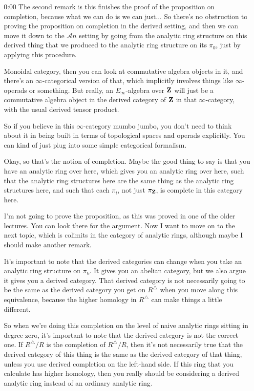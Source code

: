 \begin{unfinished}{0:00}
The second remark is this finishes the proof of the proposition on completion, because what we can do is we can just... So there's no obstruction to proving the proposition on completion in the derived setting, and then we can move it down to the $\mathcal{A}n$ setting by going from the analytic ring structure on this derived thing that we produced to the analytic ring structure on its $\pi_0$, just by applying this procedure.

Monoidal category, then you can look at commutative algebra objects in it, and there's an $\infty$-categorical version of that, which implicitly involves things like $\infty$-operads or something. But really, an $E_\infty$-algebra over $\mathbf Z$ will just be a commutative algebra object in the derived category of $\mathbf Z$ in that $\infty$-category, with the usual derived tensor product.

So if you believe in this $\infty$-category mumbo jumbo, you don't need to think about it in being built in terms of topological spaces and operads explicitly. You can kind of just plug into some simple categorical formalism.

Okay, so that's the notion of completion. Maybe the good thing to say is that you have an analytic ring over here, which gives you an analytic ring over here, such that the analytic ring structures here are the same thing as the analytic ring structures here, and such that each $\pi_i$, not just $\pi_\mathbf Z$, is complete in this category here.

I'm not going to prove the proposition, as this was proved in one of the older lectures. You can look there for the argument. Now I want to move on to the next topic, which is colimits in the category of analytic rings, although maybe I should make another remark.

It's important to note that the derived categories can change when you take an analytic ring structure on $\pi_k$. It gives you an abelian category, but we also argue it gives you a derived category. That derived category is not necessarily going to be the same as the derived category you get on $R^\triangle$ when you move along this equivalence, because the higher homology in $R^\triangle$ can make things a little different. 

So when we're doing this completion on the level of naive analytic rings sitting in degree zero, it's important to note that the derived category is not the correct one. If $R^\triangle /R$ is the completion of $R^\triangle /R$, then it's not necessarily true that the derived category of this thing is the same as the derived category of that thing, unless you use derived completion on the left-hand side. If this ring that you calculate has higher homology, then you really should be considering a derived analytic ring instead of an ordinary analytic ring.


\end{unfinished}
